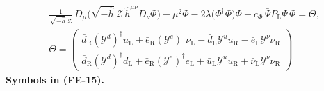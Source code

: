 \documentclass[
  10pt,
]{article}
\begin{document}
\[
\begin{aligned}
&\frac{1}{\sqrt{-\hat h}\,\mathcal{Z}}\,D_\mu\big(\sqrt{-\hat h}\,\mathcal{Z}\,\hat h^{\mu\nu}D_\nu\Phi\big) - \mu^2\Phi
 - 2\lambda\big(\Phi^\dagger\Phi\big)\Phi - c_\Phi\,\bar\Psi P_{\mathrm{L}}\Psi\,\Phi = \Theta,\\
&\Theta = \begin{pmatrix}\bar d_{\mathrm{R}}(\mathcal{Y}^{d})^\dagger u_{\mathrm{L}} + \bar e_{\mathrm{R}}(\mathcal{Y}^{e})^\dagger\nu_{\mathrm{L}}
 - \bar d_{\mathrm{L}}\mathcal{Y}^{u}u_{\mathrm{R}} - \bar e_{\mathrm{L}}\mathcal{Y}^{\nu}\nu_{\mathrm{R}}\\
 \bar d_{\mathrm{R}}(\mathcal{Y}^{d})^\dagger d_{\mathrm{L}} + \bar e_{\mathrm{R}}(\mathcal{Y}^{e})^\dagger e_{\mathrm{L}}
 + \bar u_{\mathrm{L}}\mathcal{Y}^{u}u_{\mathrm{R}} + \bar\nu_{\mathrm{L}}\mathcal{Y}^{\nu}\nu_{\mathrm{R}}\end{pmatrix}
\end{aligned} \tag{FE-15}
\] \textbf{Symbols in (FE-15).}
\end{document}
